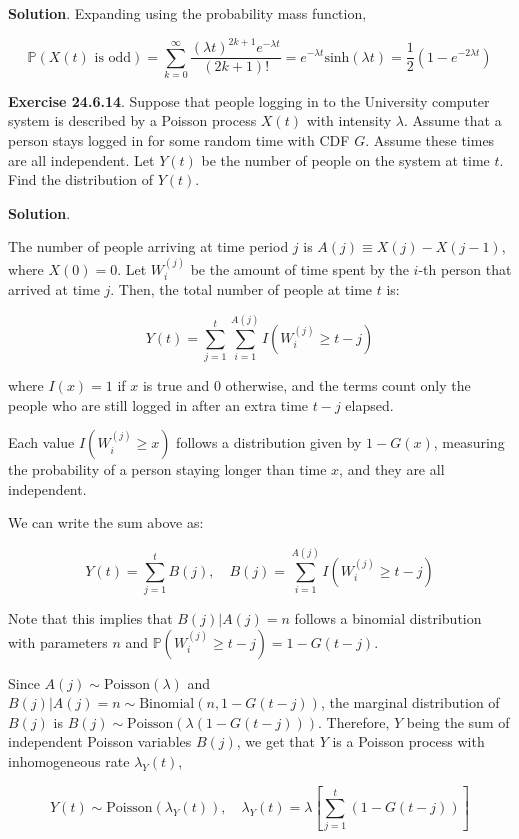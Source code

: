 \textbf{Solution}. Expanding using the probability mass function,

\[
\mathbb{P}(X(t) \text{ is odd}) = \sum_{k=0}^\infty \frac{(\lambda t)^{2k + 1} e^{-\lambda t}}{(2k + 1)!} = e^{-\lambda t} \text{sinh} (\lambda t) = \frac{1}{2}\left( 1 - e^{-2 \lambda t}\right)
\]

\textbf{Exercise 24.6.14}. Suppose that people logging in to the
University computer system is described by a Poisson process \(X(t)\)
with intensity \(\lambda\). Assume that a person stays logged in for
some random time with CDF \(G\). Assume these times are all independent.
Let \(Y(t)\) be the number of people on the system at time \(t\). Find
the distribution of \(Y(t)\).

\textbf{Solution}.

The number of people arriving at time period \(j\) is
\(A(j) \equiv X(j) - X(j-1)\), where \(X(0) = 0\). Let \(W_i^{(j)}\) be
the amount of time spent by the \(i\)-th person that arrived at time
\(j\). Then, the total number of people at time \(t\) is:

\[ Y(t) = \sum_{j=1}^t \sum_{i=1}^{A(j)} I\left(W_i^{(j)} \geq t - j\right) \]

where \(I(x) = 1\) if \(x\) is true and \(0\) otherwise, and the terms
count only the people who are still logged in after an extra time
\(t - j\) elapsed.

Each value \(I\left(W_i^{(j)} \geq x\right)\) follows a distribution
given by \(1 - G(x)\), measuring the probability of a person staying
longer than time \(x\), and they are all independent.

We can write the sum above as:

\[ Y(t) = \sum_{j=1}^t B(j), \quad B(j) =\sum_{i = 1}^{A(j)} I\left(W_i^{(j)} \geq t - j\right) \]

Note that this implies that \(B(j) | A(j) = n\) follows a binomial
distribution with parameters \(n\) and
\(\mathbb{P}\left(W_i^{(j)} \geq t - j \right) = 1 - G(t - j)\).

Since \(A(j) \sim \text{Poisson}(\lambda)\) and
\(B(j) | A(j) = n \sim \text{Binomial}(n, 1 - G(t - j))\), the marginal
distribution of \(B(j)\) is
\(B(j) \sim \text{Poisson}\left(\lambda (1 - G(t - j))\right)\).
Therefore, \(Y\) being the sum of independent Poisson variables
\(B(j)\), we get that \(Y\) is a Poisson process with inhomogeneous rate
\(\lambda_Y(t)\),

\[ Y(t) \sim \text{Poisson}\left( \lambda_Y(t) \right), \quad \lambda_Y(t) = \lambda \left[ \sum_{j=1}^t(1 - G(t - j)) \right]\]

